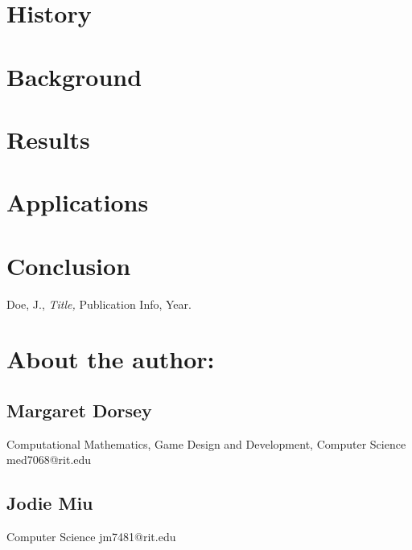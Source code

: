 \documentclass{article}
\begin{document}
\section{History}\label{History}
  

\section{Background}\label{Background}

\section{Results}\label{Results}

\section{Applications}\label{Applications}

\section{Conclusion}\label{Conclusion}



\begin{thebibliography}{9}


         {\sc Doe, J.,}
         {\em Title,}
         Publication Info, Year.


\end{thebibliography}


\section*{About the author:}



\subsection*{Margaret Dorsey}
   Computational Mathematics, Game Design and Development, Computer Science
   med7068@rit.edu

\subsection*{Jodie Miu}
   Computer Science
   jm7481@rit.edu 
\end{document}
